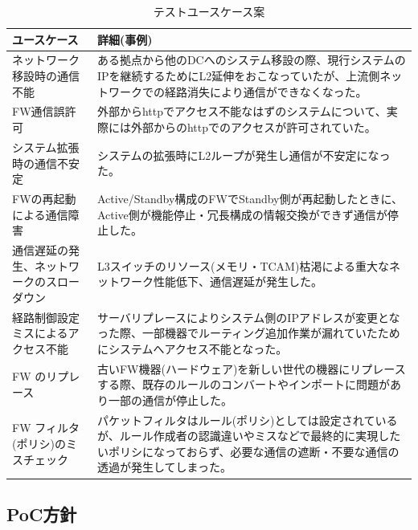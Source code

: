 \begin{table}[hb]
 \centering
 \caption{テストユースケース案}
 \label{tab:test-usecases}
 \begin{tabularx}{\linewidth}{p{10em}|X}
  \hline
  ユースケース & 詳細(事例) \\
  \hline
  \hline
  ネットワーク移設時の通信不能 & ある拠点から他のDCへのシステム移設の際、現行システムのIPを継続するためにL2延伸をおこなっていたが、上流側ネットワークでの経路消失により通信ができなくなった。 \\ \hline
  FW通信誤許可 & 外部からhttpでアクセス不能なはずのシステムについて、実際には外部からのhttpでのアクセスが許可されていた。 \\ \hline
  システム拡張時の通信不安定 & システムの拡張時にL2ループが発生し通信が不安定になった。 \\ \hline
  FWの再起動による通信障害 & Active/Standby構成のFWでStandby側が再起動したときに、Active側が機能停止・冗長構成の情報交換ができず通信が停止した。\\ \hline
  通信遅延の発生、ネットワークのスローダウン & L3スイッチのリソース(メモリ・TCAM)枯渇による重大なネットワーク性能低下、通信遅延が発生した。 \\ \hline
  経路制御設定ミスによるアクセス不能 & サーバリプレースによりシステム側のIPアドレスが変更となった際、一部機器でルーティング追加作業が漏れていたためにシステムへアクセス不能となった。 \\ \hline
  FW のリプレース & 古いFW機器(ハードウェア)を新しい世代の機器にリプレースする際、既存のルールのコンバートやインポートに問題があり一部の通信が停止した。 \\ \hline
  FW フィルタ(ポリシ)のミスチェック & パケットフィルタはルール(ポリシ)としては設定されているが、ルール作成者の認識違いやミスなどで最終的に実現したいポリシになっておらず、必要な通信の遮断・不要な通信の透過が発生してしまった。 \\
  \hline
 \end{tabularx}
\end{table}

  \subsection{PoC方針}

